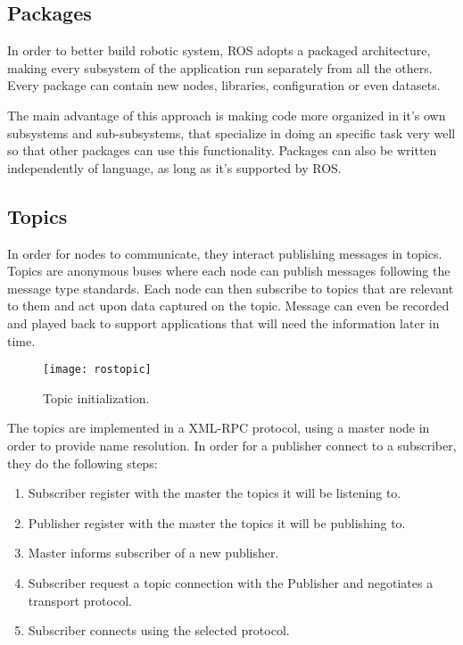 \subsection{Packages}

In order to better build robotic system, ROS adopts a packaged architecture, making every subsystem of the application run separately from all the others. Every package can contain new nodes, libraries, configuration or even datasets.

The main advantage of this approach is making code more organized in it's own subsystems and sub-subsystems, that specialize in doing an specific task very well so that other packages can use this functionality. Packages can also be written independently of language, as long as it's supported by ROS.

\subsection{Topics}

In order for nodes to communicate, they interact publishing messages in topics. Topics are anonymous buses where each node can publish messages following the message type standards. Each node can then subscribe to topics that are relevant to them and act upon data captured on the topic. Message can even be recorded and played back to support applications that will need the information later in time.

\begin{figure}[!ht]
\centering
\texttt{[image: rostopic]}
\caption{Topic initialization.}
\label{fig:rostopic}
\end{figure}

The topics are implemented in a XML-RPC protocol, using a master node in order to provide name resolution. In order for a publisher connect to a subscriber, they do the following steps:

\begin{enumerate}
\item Subscriber register with the master the topics it will be listening to.
\item Publisher register with the master the topics it will be publishing to.
\item Master informs subscriber of a new publisher.
\item Subscriber request a topic connection with the Publisher and negotiates a transport protocol.
\item Subscriber connects using the selected protocol.
\end{enumerate}

